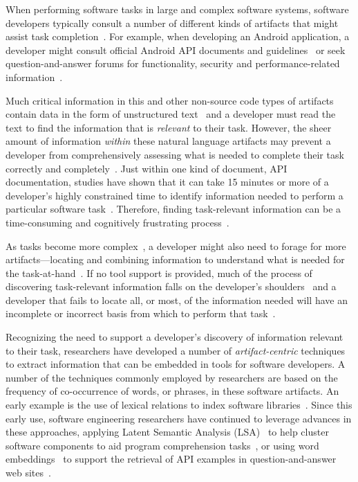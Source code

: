 

When performing software tasks in large and complex software systems, software developers typically consult a number of different kinds of artifacts that might assist task completion~\red{\cite{}}. For example, 
when developing an Android application, a developer might consult official Android API documents and guidelines~\red{\cite{}} or seek question-and-answer forums for functionality, security and performance-related information~\cite{parnin2012}.




Much critical information in this and other non-source code types of artifacts 
contain data in the form of unstructured text~\cite{Bavota2016} and 
a developer must read the text to find the information that is \textit{relevant} to their task.
However, the sheer amount of information \textit{within} these natural language artifacts may prevent a developer from comprehensively assessing what is needed to complete their task correctly and completely~\cite{Murphy2005}.  Just within one kind of document, API
documentation, studies have shown that it can take 15 minutes or more
of a developer's highly constrained time to identify 
information needed to perform a particular software task~\cite{endrikat2014, Meyer2017}.
Therefore, finding task-relevant information can be a time-consuming
and cognitively frustrating process~\cite{Begel2008,
robillard2011field}.




As tasks become more complex~\cite{Pirolli2007, Bystrom1995}, a developer might also need to forage
for more artifacts---locating and combining information to understand what is needed for the task-at-hand~\cite{Piorkowski2016}. If no tool support is provided, much of the process of discovering 
task-relevant information falls on the developer's shoulders~\red{\cite{}} and 
a developer that fails to locate all, or most, of the information needed
 will have an incomplete or incorrect basis from which to perform that task~\red{\cite{}}.





Recognizing the need to support a developer's discovery of information relevant to their task, 
researchers have developed a number of
\textit{artifact-centric} techniques
to extract
information that can be embedded in
tools for software developers. 
A number of the techniques commonly employed by researchers are based on the
frequency of co-occurrence of words, or phrases, in these software artifacts.
An early example is the use of lexical relations to index
software libraries~\cite{maarek1989}. Since this early use, software engineering
researchers have continued to leverage advances in
these approaches, applying Latent Semantic
Analysis (LSA)~\cite{deerwester1990LSI} to help cluster software components to aid
program comprehension tasks~\cite{Marcus2003}, or using 
word embeddings~\cite{Mikolov2013} to support the retrieval of API
examples in question-and-answer web sites~\cite{nguyen2017}.






